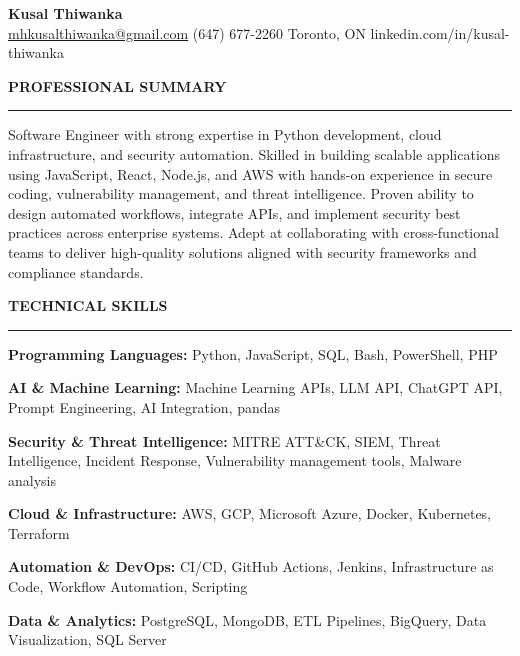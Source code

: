 \documentclass[10pt,letterpaper]{article}
\begin{document}
\begin{center}
{\LARGE\textbf{Kusal Thiwanka}}\\[3pt]
\href{mailto:mhkusalthiwanka@gmail.com}{mhkusalthiwanka@gmail.com}\hspace{2em}%
(647) 677{-}2260\hspace{2em}%
Toronto, ON\hspace{2em}
linkedin.com/in/kusal-thiwanka
\end{center}

\vspace{6pt}

\textbf{PROFESSIONAL SUMMARY}\\[-8pt]
\noindent\rule{\textwidth}{1pt}

\vspace{-2pt}

Software Engineer with strong expertise in Python development, cloud infrastructure, and security automation. Skilled in building scalable applications using JavaScript, React, Node.js, and AWS with hands-on experience in secure coding, vulnerability management, and threat intelligence. Proven ability to design automated workflows, integrate APIs, and implement security best practices across enterprise systems. Adept at collaborating with cross-functional teams to deliver high-quality solutions aligned with security frameworks and compliance standards.

\vspace{8pt}

\textbf{TECHNICAL SKILLS}\\[-8pt]
\noindent\rule{\textwidth}{1pt}

\vspace{-2pt}

\textbf{Programming Languages:} Python, JavaScript, SQL, Bash, PowerShell, PHP

\textbf{AI \& Machine Learning:} Machine Learning APIs, LLM API, ChatGPT API, Prompt Engineering, AI Integration, pandas

\textbf{Security \& Threat Intelligence:} MITRE ATT\&CK, SIEM, Threat Intelligence, Incident Response, Vulnerability management tools, Malware analysis

\textbf{Cloud \& Infrastructure:} AWS, GCP, Microsoft Azure, Docker, Kubernetes, Terraform

\textbf{Automation \& DevOps:} CI/CD, GitHub Actions, Jenkins, Infrastructure as Code, Workflow Automation, Scripting

\textbf{Data \& Analytics:} PostgreSQL, MongoDB, ETL Pipelines, BigQuery, Data Visualization, SQL Server
\end{document}
